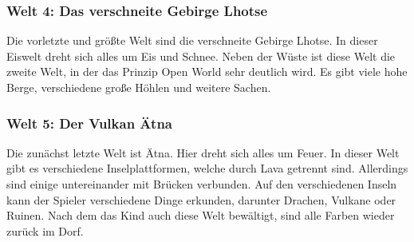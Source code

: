\subsubsection{Welt 4: Das verschneite Gebirge Lhotse}
	Die vorletzte und größte Welt sind die verschneite Gebirge Lhotse. In dieser Eiswelt dreht sich alles um Eis und Schnee. Neben der Wüste ist diese Welt die zweite Welt, in der das Prinzip Open World sehr deutlich wird. Es gibt viele hohe Berge, verschiedene große Höhlen und weitere Sachen.
	
\subsubsection{Welt 5: Der Vulkan Ätna}
	Die zunächst letzte Welt ist Ätna. Hier dreht sich alles um Feuer. In dieser Welt gibt es verschiedene Inselplattformen, welche durch Lava getrennt sind. Allerdings sind einige untereinander mit Brücken verbunden. Auf den verschiedenen Inseln kann der Spieler verschiedene Dinge erkunden, darunter Drachen, Vulkane oder Ruinen. Nach dem das Kind auch diese Welt bewältigt, sind alle Farben wieder zurück im Dorf.
